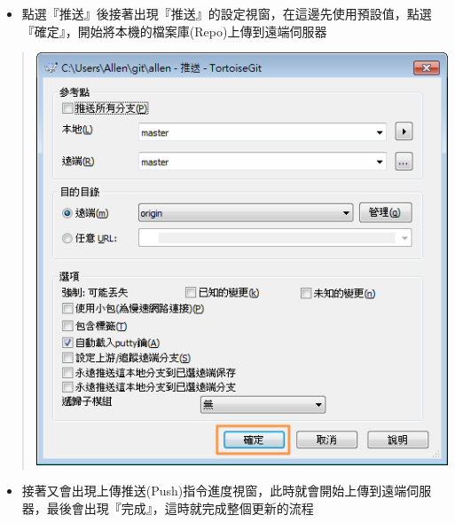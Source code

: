 \documentclass[letterpaper,10pt,english]{sphinxmanual}
\begin{document}
\begin{itemize}
\item {} 
點選『推送』後接著出現『推送』的設定視窗，在這邊先使用預設值，點選『確定』，開始將本機的檔案庫(Repo)上傳到遠端伺服器

\end{itemize}
\begin{quote}

\includegraphics{tortoisegit-push-006.png}
\end{quote}
\begin{itemize}
\item {} 
接著又會出現上傳推送(Push)指令進度視窗，此時就會開始上傳到遠端伺服器，最後會出現『完成』，這時就完成整個更新的流程

\end{itemize}
\end{document}
